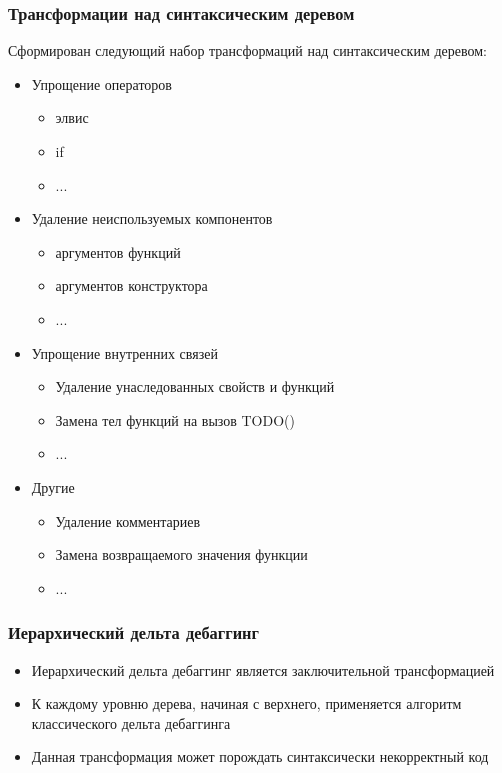 \begin{frame}
	\frametitle{Трансформации над синтаксическим деревом}
		\small
		Сформирован следующий набор трансформаций над синтаксическим деревом:
		\footnotesize
		\begin{itemize}
			\item Упрощение операторов
				\begin{itemize}
				\footnotesize
					\item элвис
					\item if
					\item ...
				\end{itemize}
			\item Удаление неиспользуемых компонентов
				\begin{itemize}
				\footnotesize
					\item аргументов функций
					\item аргументов конструктора
					\item ...
				\end{itemize}
			\item Упрощение внутренних связей
				\begin{itemize}
				\footnotesize
					\item Удаление унаследованных свойств и функций
					\item Замена тел функций на вызов TODO()
					\item ...
				\end{itemize}
			\item Другие
				\begin{itemize}
					\footnotesize
					\item Удаление комментариев
					\item Замена возвращаемого значения функции
					\item ...
				\end{itemize}
		\end{itemize}				
\end{frame}



\begin{frame}
	\frametitle{Иерархический дельта дебаггинг}
		\begin{itemize}
			\item Иерархический дельта дебаггинг является заключительной трансформацией
			\item К каждому уровню дерева, начиная с верхнего, применяется алгоритм классического дельта дебаггинга
			\item Данная трансформация может порождать синтаксически некорректный код
		\end{itemize}
\end{frame}

